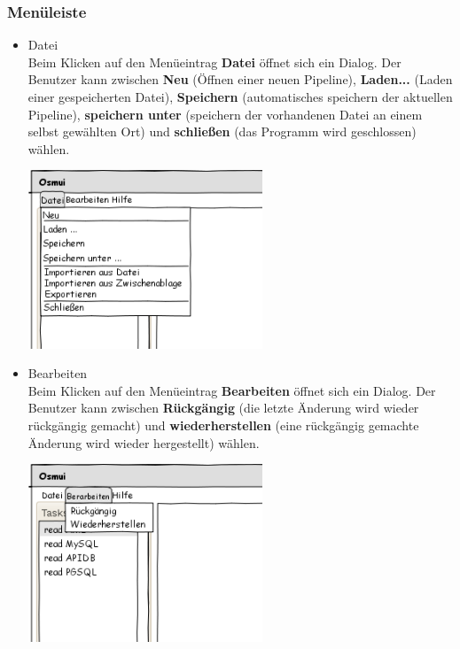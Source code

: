 \documentclass[a4paper,12pt]{scrartcl}
\begin{document}
\subsubsection{Menüleiste}
\begin{itemize}
\item Datei\\
Beim Klicken auf den Menüeintrag \textbf{Datei} öffnet sich ein Dialog. Der Benutzer kann zwischen \textbf{Neu} (Öffnen einer neuen Pipeline), \textbf{Laden...} (Laden einer gespeicherten Datei), \textbf{Speichern} (automatisches speichern der aktuellen Pipeline), \textbf{speichern unter} (speichern der vorhandenen Datei an einem selbst gewählten Ort) und \textbf{schließen} (das Programm wird geschlossen) wählen. 
\\ 
\begin{center}
\includegraphics[width=7cm]{ui_prototype/OsmUi_Dateiklein.png}
\end{center}
\item Bearbeiten\\
Beim Klicken auf den Menüeintrag \textbf{Bearbeiten} öffnet sich ein Dialog. Der Benutzer kann zwischen \textbf{Rückgängig} (die letzte Änderung wird wieder rückgängig gemacht) und \textbf{wiederherstellen} (eine rückgängig gemachte Änderung wird wieder hergestellt) wählen.
\\
\begin{center}
\includegraphics[width=7cm]{ui_prototype/OsmUi_Bearbeitenklein.png}
\end{center}

\end{itemize}
\end{document}

